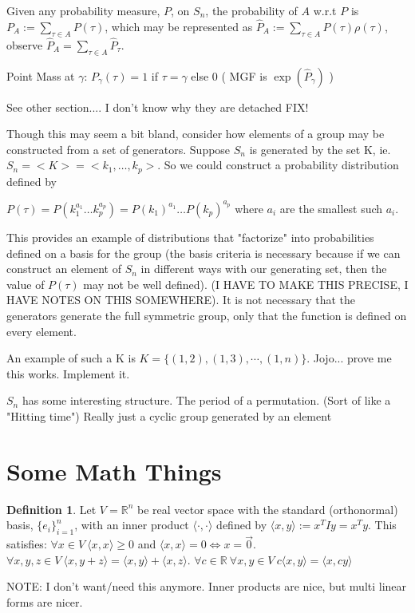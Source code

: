 \documentclass{article}
\theoremstyle{definition}
\newtheorem{definition}{Definition}
\begin{document}
Given any probability measure, $P$, on $S_n$, the probability of $A$ w.r.t $P$ is $ P_A  := \sum_{\tau \in A} P(\tau) $, which may be represented as $\hat{P}_A := \sum_{\tau \in A} P(\tau) \rho(\tau) $, observe $\hat{P}_A = \sum_{\tau \in A} \hat{P}_\tau $. 

Point Mass at $\gamma$: $ P_\gamma(\tau) = 1 $ if $\tau = \gamma$ else 0
( MGF is $\exp(\hat{P}_\gamma)$ )

See other section.... I don't know why they are detached FIX!



Though this may seem a bit bland, consider how elements of a group may be constructed from a set of generators. Suppose $S_n$ is generated by the set K, ie. $S_n = < K > = <k_1, \dots, k_p >$. So we could construct a probability distribution defined by

\( P(\tau) = P( k_1^{a_1} \dots k_p^{a_p}) = P( k_1)^{a_1}\dots P(k_p )^{a_p} \) where $a_i$ are the smallest such $a_i$.

This provides an example of distributions that "factorize" into probabilities defined on a basis for the group (the basis criteria is necessary because if we can construct an element of $S_n$ in different ways with our generating set, then the value of $P(\tau)$ may not be well defined). (I HAVE TO MAKE THIS PRECISE, I HAVE NOTES ON THIS SOMEWHERE). It is not necessary that the generators generate the full symmetric group, only that the function is defined on every element.

An example of such a K is $K= \{(1,2), (1,3), \cdots, (1,n) \}$. Jojo... prove me this works. Implement it.

$S_n$ has some interesting structure.
The period of a permutation. (Sort of like a "Hitting time")
Really just a cyclic group generated by an element

\section{Some Math Things}
\begin{definition}
Let $V=\mathbb{R}^n$ be real vector space with the standard (orthonormal) basis, $\{e_i\}_{i=1}^n$, with an inner product $\langle \cdot,\cdot \rangle$ defined by $\langle x,y\rangle := x^T Iy = x^Ty$. This satisfies:
$\forall x \in V \: \langle x,x \rangle \geq 0 $ and $\langle x,x\rangle=0 \iff x=\vec{0} $.
$\forall x,y,z \in V \: \langle x,y+z \rangle= \langle x,y \rangle +  \langle x,z \rangle$.
$\forall c \in \mathbb{R} \: \forall x,y \in V \: c\langle x,y \rangle=\langle x,cy \rangle$
\end{definition}
NOTE: I don't want/need this anymore. Inner products are nice, but multi linear forms are nicer.
\end{document}
